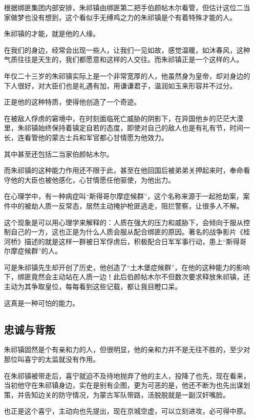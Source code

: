 \begin{multicols}{\theparacolNo}
根据绑匪集团内部安排，朱祁镇由绑匪第二把手伯颜帖木尔看管，但估计这位二当家做梦也没有想到，这个看似手无缚鸡之力的朱祁镇是个有着特殊才能的人。

朱祁镇的才能，就是他的人缘。

在我们的身边，经常会出现一些人，让我们一见如故，感觉温暖，如沐春风，这种气质往往是天生的，我们都愿意和这样的人交往。而朱祁镇正是一个这样的人。

年仅二十三岁的朱祁镇实际上是一个非常宽厚的人，他虽然身为皇帝，却对身边的下人很好，对大臣们也是礼遇有加，用谦谦君子，温润如玉来形容并不过分。

正是他的这种特质，使得他创造了一个奇迹。

在被敌人俘虏的窘境中，在时刻面临死亡威胁的阴影下，在异国他乡的茫茫大漠里，朱祁镇始终保持着镇定自若的态度，即使对自己的敌人也是有礼有节，时间一长，连看管他的蒙古士兵和军官都心甘情愿为他效力。

其中甚至还包括二当家伯颜帖木尔。

而朱祁镇的这种能力作用还不限于此，甚至在他回国后被弟弟关押起来时，奉命看守他的大臣也被他感化，心甘情愿任他驱使，为他出力。

在心理学中，有一种病症叫“斯得哥尔摩症候群”，这个名称来源于一起抢劫案，案件中的被劫人质一反常态，居然主动掩护枪匪逃走，阻拦警察，让很多人不解。

这个现象是可以用心理学来解释的：人质在强大的压力和威胁下，会倾向于服从控制自己的一方，这也正是为什么人质会服从配合绑匪的原因。著名的战争影片《桂河桥》描述的就是这样一群被日军俘虏后，积极配合日军军事行动，患上“斯得哥尔摩症候群”的人。

可是朱祁镇先生却开创了历史，他创造了“土木堡症候群”，在他的这种能力的影响下，绑匪竟然会主动站在人质一边！此后伯颜帖木尔不但数次要求释放朱祁镇，还主动为其争取皇位，每每看到这些记载，都让我目瞪口呆。

这真是一种可怕的能力。

\subsection{忠诚与背叛}
朱祁镇固然是个有亲和力的人，但很明显，他的亲和力并不是无往不胜的，至少对那位叫喜宁的太监就没有作用。

在朱祁镇被带走后，喜宁就迫不及待地抛弃了他的主人，投降了也先，现在看来，当初他守在朱祁镇身边，实在是别有企图，更为可恶的是，他还不断为也先出谋划策，并告知边关的防守情况，为蒙古军队带路，活脱脱就是一副汉奸嘴脸。

也正是这个喜宁，主动向也先提出，现在京城空虚，可以立刻进攻，必可得中原。


\end{multicols}
